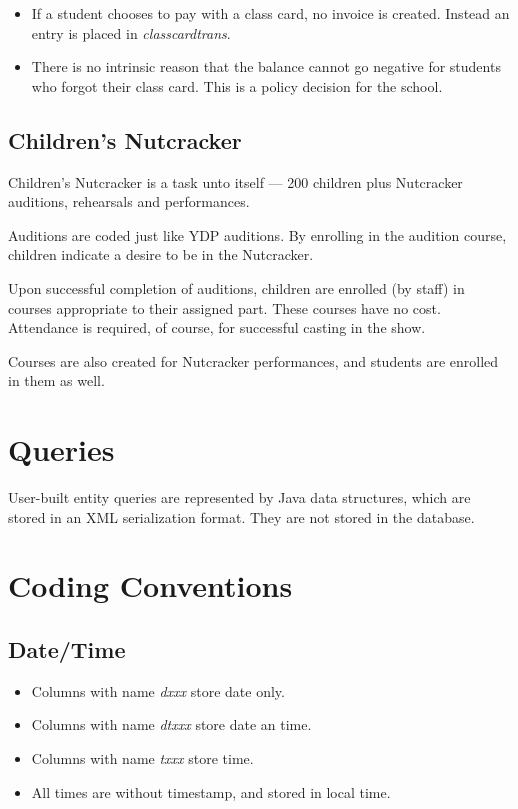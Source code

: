 \documentclass[11pt]{article}
\begin{document}
 \begin{itemize}
 \item If a student chooses to pay with a class card, no invoice is created.  Instead an entry is placed in \emph{classcardtrans}.
 \item There is no intrinsic reason that the balance cannot go negative for students who forgot their class card.  This is a policy decision for the school.
 \end{itemize}

\subsection{Children's Nutcracker}

Children's Nutcracker is a task unto itself --- 200 children plus Nutcracker auditions, rehearsals and performances.

Auditions are coded just like YDP auditions.  By enrolling in the
audition course, children indicate a desire to be in the Nutcracker.

Upon successful completion of auditions, children are enrolled (by
staff) in courses appropriate to their assigned part.  These courses
have no cost.  Attendance is required, of course, for successful
casting in the show.

Courses are also created for Nutcracker performances, and students are
enrolled in them as well.


\section{Queries}

User-built entity queries are represented by Java data structures, which are stored in an XML serialization format.  They are not stored in the database.

\section{Coding Conventions}

\subsection{Date/Time}
\begin{itemize}
 \item Columns with name \emph{dxxx} store date only.
 \item Columns with name \emph{dtxxx} store date an time.
 \item Columns with name \emph{txxx} store time.
 \item All times are without timestamp, and stored in local time.
\end{itemize}
\end{document}
